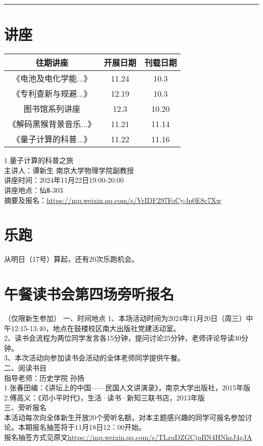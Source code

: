 \documentclass[letterpaper, 12pt]{article}
\begin{document}
\hrule
\pagebreak
\begin{multicols}{2}

\section{讲座}
\begin{tabular}{|c|c|c|}
    \hline
    往期讲座 & 开展日期 & 刊载日期\\
    \hline\hline
    《电池及电化学能...》 & 11.24 & 10.3\\
    《专利查新与规避...》 & 12.19 & 10.3\\
    图书馆系列讲座 & 12.3 & 10.20\\
    《解码黑猴背景音乐...》 & 11.21 & 11.14\\
    《量子计算的科普...》 & 11.22 & 11.16\\
    
    \hline
\end{tabular}

1.量子计算的科普之旅\\
主讲人：谭新生 南京大学物理学院副教授\\
讲座时间：2024年11月22日19:00-20:00\\
讲座地点：仙Ⅱ-303\\
摘要及报名：\url{https://mp.weixin.qq.com/s/VrIDF297FoCy-lp0E8c7Xw}

\section{乐跑}
从明日（17号）算起，还有20次乐跑机会。
\section{午餐读书会第四场旁听报名}
（仅限新生参加）
一、时间地点
1、本场活动时间为2024年11月20日（周三）中午12:15-13:40，地点在鼓楼校区南大出版社党建活动室。\\
2、读书会流程为两位同学发言各15分钟，提问讨论25分钟，老师评论导读30分钟。\\
3、本次活动向参加读书会活动的全体老师同学提供午餐。\\
二、阅读书目\\
指导老师：历史学院 孙扬\\
1.张春田编：《讲坛上的中国——民国人文讲演录》，南京大学出版社，2015年版\\
2.傅高义：《邓小平时代》，生活·读书·新知三联书店，2013年版\\
三、旁听报名\\
本活动每次向全体新生开放20个旁听名额，对本主题感兴趣的同学可报名参加讨论。本期报名抽签将于11月18日12：00开始。\\
报名抽签方式见原文\url{https://mp.weixin.qq.com/s/TLzuDZGCjpBN4HNksJ4gJA}

\end{multicols}
\end{document}
